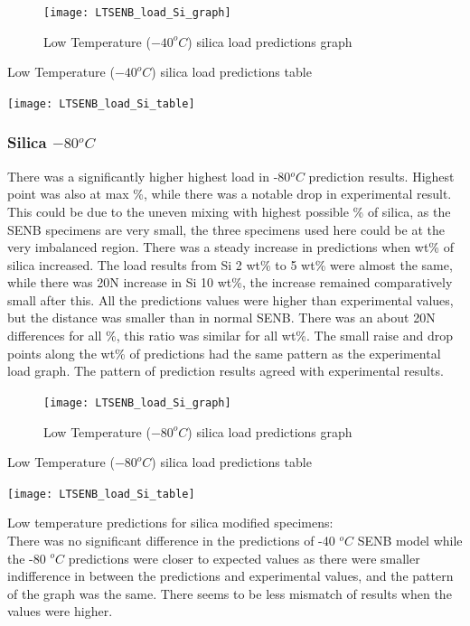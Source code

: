 \documentclass[numbers=noendperiod,chapterprefix=on]{icldt} %
\begin{document}
{\begin{figure}[!hp]
  \centering
  \texttt{[image: LTSENB\_load\_Si\_graph]}\label{LTSENB_load_Si_graph}
  \caption{Low Temperature ($ -40 ^{o}C$) silica load predictions graph}
  \end{figure}
  \FloatBarrier
 
 \begin{table}
   \centering
   \caption{Low Temperature ($ -40 ^{o}C$) silica load predictions table}\label{LTSENB_load_Si_table}
   \texttt{[image: LTSENB\_load\_Si\_table]}
   \end{table}
   \FloatBarrier

\subsubsection{Silica $ -80 ^{o}C$}
There was a significantly higher highest load in -80$^{o}C$ prediction results. Highest point was also at max \%, while there was a notable drop in experimental result. This could be due to the uneven mixing with highest possible \% of silica, as the SENB specimens are very small, the three specimens used here could be at the very imbalanced region. There was a steady increase in predictions when wt\% of silica increased. The load results from Si 2 wt\% to 5 wt\% were almost the same, while there was 20N increase in Si 10 wt\%, the increase remained comparatively small after this. All the predictions values were higher than experimental values, but the distance was smaller than in normal SENB. There was an about 20N differences for all \%, this ratio was similar for all wt\%.
The small raise and drop points along the wt\% of predictions had the same pattern as the experimental load graph. The pattern of prediction results agreed with experimental results. 

\begin{figure}[!hp]
  \centering
  \texttt{[image: LTSENB\_load\_Si\_graph]}\label{LTSENB_load_Si_80_graph}
  \caption{Low Temperature ($ -80 ^{o}C$) silica load predictions graph}
  \end{figure}

 
 \begin{table}
   \centering
   \caption{Low Temperature ($ -80 ^{o}C$) silica load predictions table}\label{LTSENB_load_80_Si_table}
   \texttt{[image: LTSENB\_load\_Si\_table]}
   \end{table}
   

Low temperature predictions for silica modified specimens: \\
There was no significant difference in the predictions of -40 $^{o}C$ SENB model while the -80 $^{o}C$ predictions were closer to expected values as there were smaller indifference in between the predictions and experimental values, and the pattern of the graph was the same. There seems to be less mismatch of results when the values were higher.

}
\end{document}

